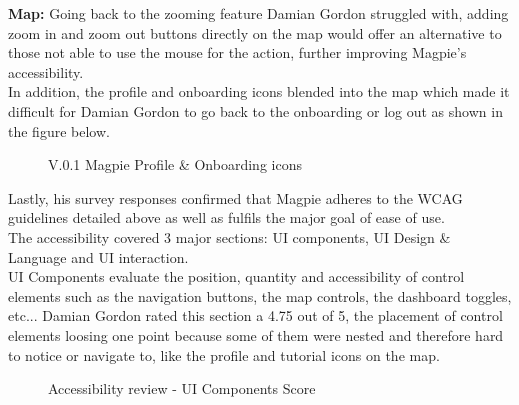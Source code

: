 \newpage
\noindent\textbf{Map: }
Going back to the zooming feature Damian Gordon struggled with, adding zoom in and zoom out buttons directly on the map would offer an alternative to those not able to use the mouse for the action, further improving Magpie's accessibility.\\In addition, the profile and onboarding icons blended into the map which made it difficult for Damian Gordon to go back to the onboarding or log out as shown in the figure below.
\begin{figure}
    \centering
    \caption{V.0.1 Magpie Profile \& Onboarding icons}
\end{figure}

\newpage
Lastly, his survey responses confirmed that Magpie adheres to the WCAG guidelines detailed above as well as fulfils the major goal of ease of use.\\
The accessibility covered 3 major sections: UI components, UI Design \& Language and UI interaction.\\
UI Components evaluate the position, quantity and accessibility of control elements such as the navigation buttons, the map controls, the dashboard toggles, etc... Damian Gordon rated this section a 4.75 out of 5, the placement of control elements loosing one point because some of them were nested and therefore hard to notice or navigate to, like the profile and tutorial icons on the map.
\begin{figure}
    \centering
    \caption{Accessibility review - UI Components Score}
\end{figure}

